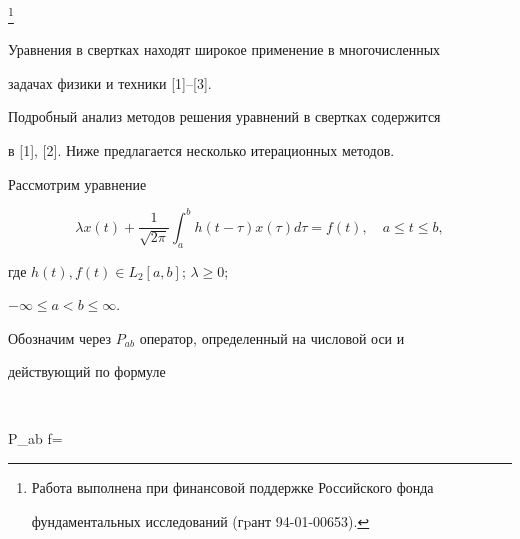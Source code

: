  


\thanks{Работа выполнена при финансовой поддержке Российского фонда


фундаментальных исследований (гpант 94-01-00653).}


\date{} 




 


\pagestyle{plain} %


 


 




 


\maketitle 


 


Уравнения в свертках находят широкое применение в многочисленных


задачах физики и техники [1]--[3].


Подробный анализ методов решения уравнений в свертках содержится


в [1], [2]. Ниже предлагается несколько итерационных методов.





Рассмотрим уравнение


\begin{equation}


\lambda x(t)+\frac{1}{\sqrt{2\pi}}


\int_{a}^ b h(t-\tau) x(\tau) d\tau=f(t),


\quad a\le t \le b,


\end{equation}


где $ h(t), f(t)\in L_2 [a,b]$; $\lambda \ge 0$;


$-\infty\le a<b\le\infty.$





Обозначим через $P_{ab}$ оператор, определенный на числовой оси и


действующий по формуле


$$


P_{ab} f=


